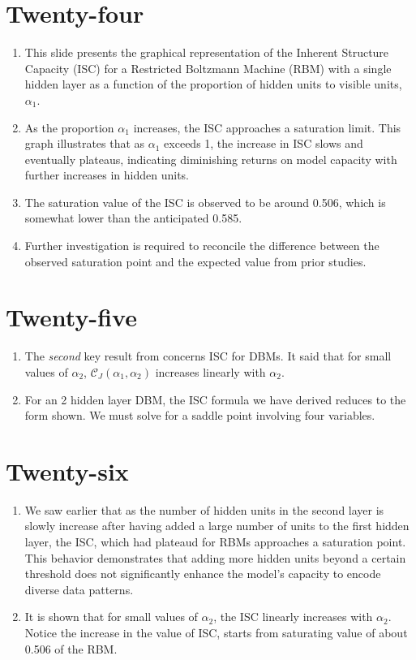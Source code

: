 \documentclass{article}
\begin{document}
\section*{Twenty-four}
\begin{enumerate}
    \item This slide presents the graphical representation of the Inherent Structure Capacity (ISC) for a Restricted Boltzmann Machine (RBM) with a single hidden layer as a function of the proportion of hidden units to visible units, \( \alpha_1 \).
    \item As the proportion \( \alpha_1 \) increases, the ISC approaches a saturation limit. This graph illustrates that as \( \alpha_1 \) exceeds 1, the increase in ISC slows and eventually plateaus, indicating diminishing returns on model capacity with further increases in hidden units.
    \item The saturation value of the ISC is observed to be around 0.506, which is somewhat lower than the anticipated 0.585.
    \item Further investigation is required to reconcile the difference between the observed saturation point and the expected value from prior studies.
\end{enumerate}

\section*{Twenty-five}
\begin{enumerate}
    \item The \emph{second} key result from \cite{bansal2018using} concerns ISC for DBMs. It said that for small values of \(\alpha_{2}\), \(\mathcal{C}_{J} (\alpha_{1}, \alpha_{2})\) increases linearly with \(\alpha_{2}\).
    \item For an 2 hidden layer DBM, the ISC formula we have derived reduces to the form shown. We must solve for a saddle point involving four variables.
\end{enumerate}

\section*{Twenty-six}
\begin{enumerate}
    \item We saw earlier that as the number of hidden units in the second layer is slowly increase after having added a large number of units to the first hidden layer, the ISC, which had plateaud  for RBMs approaches a saturation point. This behavior demonstrates that adding more hidden units beyond a certain threshold does not significantly enhance the model’s capacity to encode diverse data patterns.
    \item It is shown that for small values of \(\alpha_2\), the ISC linearly increases with \(\alpha_2\). Notice the increase in the value of ISC, starts from saturating value of about 0.506 of the RBM.
\end{enumerate}
\end{document}
